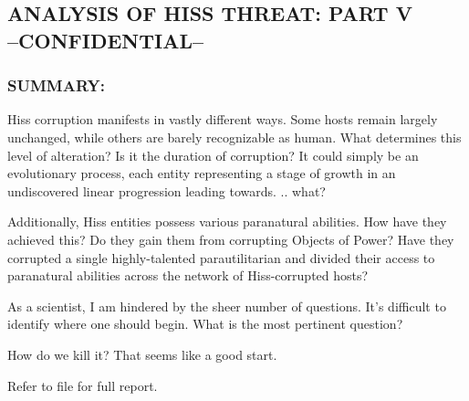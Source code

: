 \subsection*{ANALYSIS OF HISS THREAT: PART V\\
	--CONFIDENTIAL--}
\subsubsection*{SUMMARY:}
\par Hiss corruption manifests in vastly different ways. Some hosts
remain largely unchanged, while others are barely recognizable as
human. What determines this level of alteration? Is it the duration
of corruption? It could simply be an evolutionary process, each
entity representing a stage of growth in an undiscovered linear
progression leading towards. .. what?
\par Additionally, Hiss entities possess various paranatural abilities.
How have they achieved this? Do they gain them from corrupting
Objects of Power? Have they corrupted a single highly-talented
parautilitarian and divided their access to paranatural abilities
across the network of Hiss-corrupted hosts?
\par As a scientist, I am hindered by the sheer number of questions.
It's difficult to identify where one should begin. What is the most
pertinent question?
\par How do we kill it? That seems like a good start.
\par Refer to file  for full report.
